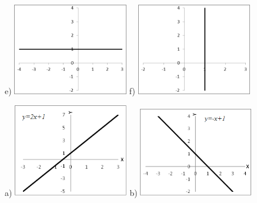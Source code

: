 \begin{respostas}{3}
\begin{figure}[H]
	e) \includegraphics[width=0.45\textwidth]{capitulos/funcao_do_primeiro_grau/media/image47.png} 
	f) \includegraphics[width=0.45\textwidth]{capitulos/funcao_do_primeiro_grau/media/image48.png}
\end{figure}

\begin{figure}[H]
	\ansitem{}

	a) \includegraphics[width=0.45\textwidth]{capitulos/funcao_do_primeiro_grau/media/image49.png} 
	b) \includegraphics[width=0.45\textwidth]{capitulos/funcao_do_primeiro_grau/media/image50.png}
\end{figure}


\end{respostas}
